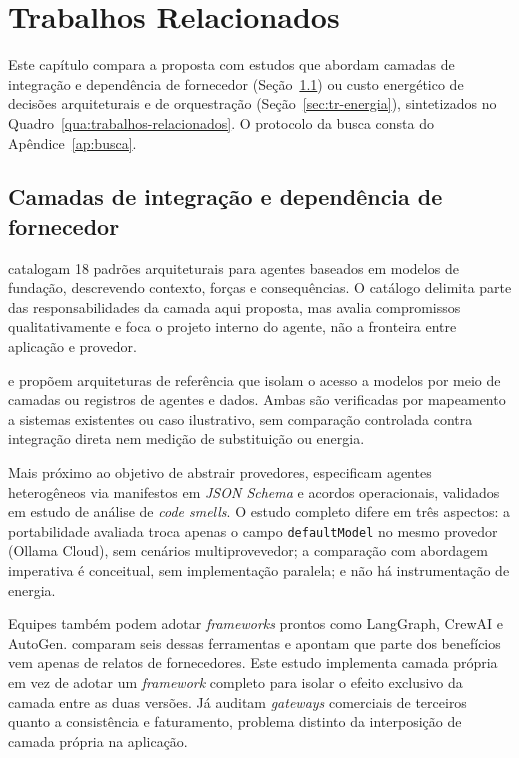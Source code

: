 \chapter{Trabalhos Relacionados}
\label{cap:trabalhos-relacionados}

Este capítulo compara a proposta com estudos que abordam camadas de integração
e dependência de fornecedor (Seção~\ref{sec:tr-arquiteturas}) ou custo
energético de decisões arquiteturais e de orquestração
(Seção~\ref{sec:tr-energia}), sintetizados no
Quadro~\ref{qua:trabalhos-relacionados}. O protocolo da busca consta do
Apêndice~\ref{ap:busca}.

\section{Camadas de integração e dependência de fornecedor}
\label{sec:tr-arquiteturas}

 catalogam 18 padrões arquiteturais para agentes baseados
em modelos de fundação, descrevendo contexto, forças e consequências. O
catálogo delimita parte das responsabilidades da camada aqui proposta, mas
avalia compromissos qualitativamente e foca o projeto interno do agente, não a
fronteira entre aplicação e provedor.

 e  propõem arquiteturas de
referência que isolam o acesso a modelos por meio de camadas ou registros de
agentes e dados. Ambas são verificadas por mapeamento a sistemas existentes ou
caso ilustrativo, sem comparação controlada contra integração direta nem medição
de substituição ou energia.

Mais próximo ao objetivo de abstrair provedores, 
especificam agentes heterogêneos via manifestos em \textit{JSON Schema} e
acordos operacionais, validados em estudo de análise de \textit{code smells}. O
estudo completo difere em três aspectos: a portabilidade avaliada troca apenas o
campo \texttt{defaultModel} no mesmo provedor (Ollama Cloud), sem cenários
multiprovevedor; a comparação com abordagem imperativa é conceitual, sem
implementação paralela; e não há instrumentação de energia.

Equipes também podem adotar \textit{frameworks} prontos como LangGraph, CrewAI
e AutoGen.  comparam seis dessas ferramentas e apontam que
parte dos benefícios vem apenas de relatos de fornecedores. Este estudo
implementa camada própria em vez de adotar um \textit{framework} completo para
isolar o efeito exclusivo da camada entre as duas versões. Já
 auditam \textit{gateways} comerciais de terceiros quanto a
consistência e faturamento, problema distinto da interposição de camada própria
na aplicação.

